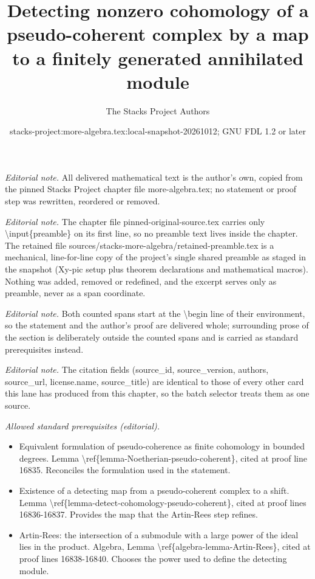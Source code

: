 \documentclass[10pt,a4paper]{amsart}
\title{Detecting nonzero cohomology of a pseudo-coherent complex by a map to a finitely generated annihilated module}
\author{The Stacks Project Authors}
\date{stacks-project:more-algebra.tex:local-snapshot-20261012; GNU FDL 1.2 or later}
\theoremstyle{plain}
\theoremstyle{definition}
\theoremstyle{remark}
\numberwithin{equation}{subsection}
\begin{document}
\maketitle
\setcounter{subsection}{1}
\noindent\textit{Editorial note.} All delivered mathematical text is the author's own, copied from the pinned Stacks Project chapter file more-algebra.tex; no statement or proof step was rewritten, reordered or removed.\par\medskip
\noindent\textit{Editorial note.} The chapter file pinned-original-source.tex carries only \textbackslash{}input\{preamble\} on its first line, so no preamble text lives inside the chapter. The retained file sources/stacks-more-algebra/retained-preamble.tex is a mechanical, line-for-line copy of the project's single shared preamble as staged in the snapshot (Xy-pic setup plus theorem declarations and mathematical macros). Nothing was added, removed or redefined, and the excerpt serves only as preamble, never as a span coordinate.\par\medskip
\noindent\textit{Editorial note.} Both counted spans start at the \textbackslash{}begin line of their environment, so the statement and the author's proof are delivered whole; surrounding prose of the section is deliberately outside the counted spans and is carried as standard prerequisites instead.\par\medskip
\noindent\textit{Editorial note.} The citation fields (source\_id, source\_version, authors, source\_url, license.name, source\_title) are identical to those of every other card this lane has produced from this chapter, so the batch selector treats them as one source.\par\medskip
\noindent\textit{Allowed standard prerequisites (editorial).}\begin{itemize}
\item Equivalent formulation of pseudo-coherence as finite cohomology in bounded degrees. Lemma \textbackslash{}ref\{lemma-Noetherian-pseudo-coherent\}, cited at proof line 16835. Reconciles the formulation used in the statement.
\item Existence of a detecting map from a pseudo-coherent complex to a shift. Lemma \textbackslash{}ref\{lemma-detect-cohomology-pseudo-coherent\}, cited at proof lines 16836-16837. Provides the map that the Artin-Rees step refines.
\item Artin-Rees: the intersection of a submodule with a large power of the ideal lies in the product. Algebra, Lemma \textbackslash{}ref\{algebra-lemma-Artin-Rees\}, cited at proof lines 16838-16840. Chooses the power used to define the detecting module.
\end{itemize}\medskip
\end{document}
